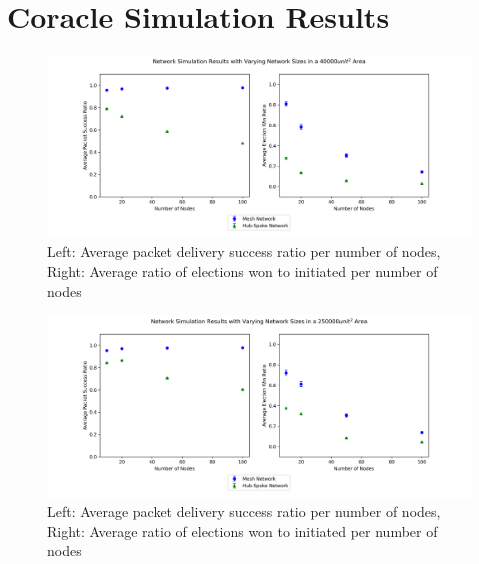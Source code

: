 \section{Coracle Simulation Results}
\label{sec:appendix-for-coracle-results}

\begin{figure}[H]
    \centering
    \includegraphics[width=0.9\columnwidth]{images/200unit^2.png}
    \caption{Left: Average packet delivery success ratio per number of nodes, Right: Average ratio of elections won to initiated per number of nodes }
    \label{fig:simulation_result_200}
\end{figure}


\begin{figure}[H]
    \centering
    \includegraphics[width=0.9\columnwidth]{images/500unit^2.png}
    \caption{Left: Average packet delivery success ratio per number of nodes, Right: Average ratio of elections won to initiated per number of nodes }
    \label{fig:simulation_result_500}
\end{figure}